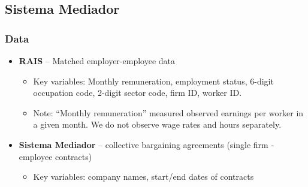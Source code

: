 \documentclass[aspectratio=169]{beamer}
\begin{document}
		\subsection{Sistema Mediador}
			\begin{frame}
				\frametitle{Data}
				\label{sistema_mediador}
				\begin{itemize}
					\item \textbf{RAIS} \--- Matched employer-employee data 
					\begin{itemize}
						\item Key variables: Monthly remuneration, employment status, 6-digit occupation code, 2-digit sector code, firm ID, worker ID.
						\item Note: ``Monthly remuneration'' measured observed earnings per worker in a given month. We do not observe wage rates and hours separately.
					\end{itemize}
					\item \textbf{Sistema Mediador} \--- collective bargaining agreements (single firm - employee contracts)
			 		\begin{itemize}
				 		\item Key variables: company names, start/end dates of contracts
					 \end{itemize}
				 \end{itemize}
				 \hyperlink{typical_cba}{}
			 \end{frame}

			 
\end{document}
